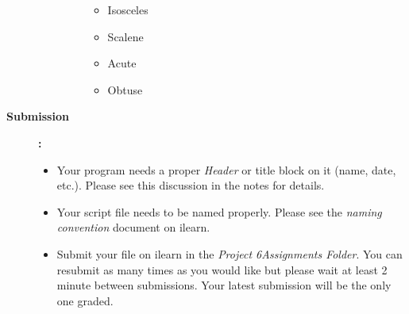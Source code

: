 \documentclass[11pt]{article}
\newcommand{\assnNum}{6}
\begin{document}
\begin{description}
\begin{description}
\begin{enumerate}
\begin{itemize}
\item Isosceles
\item Scalene
\item Acute 
\item Obtuse
\end{itemize}
			\end{enumerate}
%	
	
			\end{description}
			
	\newpage
\item [\textbf{Submission }]\textbf{:} \\
			\begin{itemize}
				\item Your program needs a proper {\it Header} or title block on it (name, date, etc.). Please see this discussion in the notes for details.\\
				\item Your script file needs to be named properly. Please see the {\it naming convention} document on ilearn. \\
				\item Submit your file on ilearn in the {\it Project \assnNum Assignments Folder}. You can resubmit as many times as you would like but please wait at least 2 minute between submissions. Your latest submission will be the only one graded.\\

			\end{itemize}
   	
    	\end{description}
 
\end{document}
